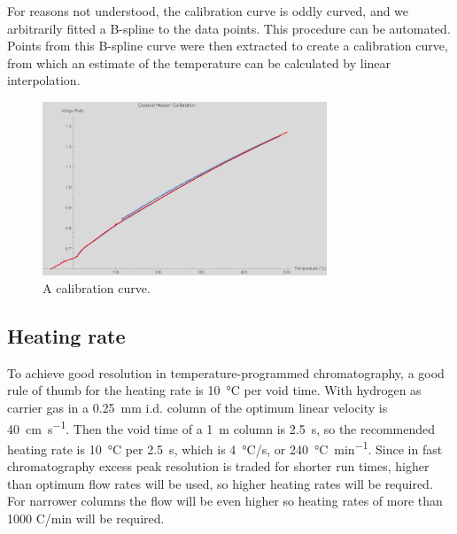 \documentclass[aip,rsi,preprint,graphicx]{revtex4-1} %
\begin{document}


For reasons not understood, the calibration curve is oddly curved, and we
arbitrarily fitted a B-spline to the data points. This procedure can be
automated\cite{WenniZheng2012}. Points from this B-spline curve were then
extracted to create a calibration curve, from which an estimate of the
temperature can be calculated by linear interpolation\cite{Possolo2017}.

\begin{figure}
\includegraphics[width=8.5cm]{./Figures/2015_04_24_Calibration.pdf}%
\caption{\label{TempCal}A calibration curve.}%
\end{figure}

\subsection{Heating rate}

To achieve good resolution in temperature-programmed chromatography, a good rule
of thumb for the heating rate is \SI{10}{\celsius} per void
time\cite{Blumberg2000}. With hydrogen as carrier gas in a
\SI{0.25}{\milli\metre} i.d. column of the optimum linear velocity is
\SI{40}{\centi\metre\per\second}. Then the void time of a \SI{1}{\metre} column
is \SI{2.5}{\s}, so the recommended heating rate is \SI{10}{\celsius} per
\SI{2.5}{\s}, which is \SI{4}{\celsius}/s, or \SI{240}{\celsius\per\minute}.
Since in fast chromatography excess peak resolution is traded for shorter run
times, higher than optimum flow rates will be used, so higher heating rates will
be required. For narrower columns the flow will be even higher so heating rates
of more than 1000 C\textdegree/min will be required.
\end{document}
